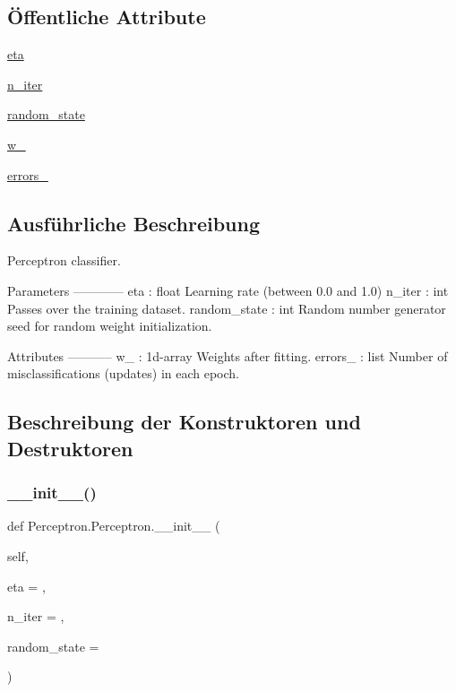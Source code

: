 \subsection*{Öffentliche Attribute}
\begin{DoxyCompactItemize}
\item 
\mbox{\hyperlink{class_perceptron_1_1_perceptron_a74c50bc1321f3e226ca4e0f96316378d}{eta}}
\item 
\mbox{\hyperlink{class_perceptron_1_1_perceptron_a39c8cf01e04f72473ea4b817fbc32405}{n\+\_\+iter}}
\item 
\mbox{\hyperlink{class_perceptron_1_1_perceptron_ab6afa4dc8b06b17e82885aaf6c20aa81}{random\+\_\+state}}
\item 
\mbox{\hyperlink{class_perceptron_1_1_perceptron_ae70631ee7d9fbd1c562c9891941d6a62}{w\+\_\+}}
\item 
\mbox{\hyperlink{class_perceptron_1_1_perceptron_af304ae57628fdf47e1d2fec6cc5f5417}{errors\+\_\+}}
\end{DoxyCompactItemize}


\subsection{Ausführliche Beschreibung}
\begin{DoxyVerb}Perceptron classifier.

Parameters
------------
eta : float
  Learning rate (between 0.0 and 1.0)
n_iter : int
  Passes over the training dataset.
random_state : int
  Random number generator seed for random weight
  initialization.

Attributes
-----------
w_ : 1d-array
  Weights after fitting.
errors_ : list
  Number of misclassifications (updates) in each epoch.\end{DoxyVerb}
 

\subsection{Beschreibung der Konstruktoren und Destruktoren}
\mbox{\label{class_perceptron_1_1_perceptron_a612d2470864b433455123ab67596c79e}} 
\subsubsection{\texorpdfstring{\+\_\+\+\_\+init\+\_\+\+\_\+()}{\_\_init\_\_()}}
{\footnotesize\ttfamily def Perceptron.\+Perceptron.\+\_\+\+\_\+init\+\_\+\+\_\+ (\begin{DoxyParamCaption}\item[{}]{self,  }\item[{}]{eta = {},  }\item[{}]{n\+\_\+iter = {},  }\item[{}]{random\+\_\+state = {} }\end{DoxyParamCaption})}



